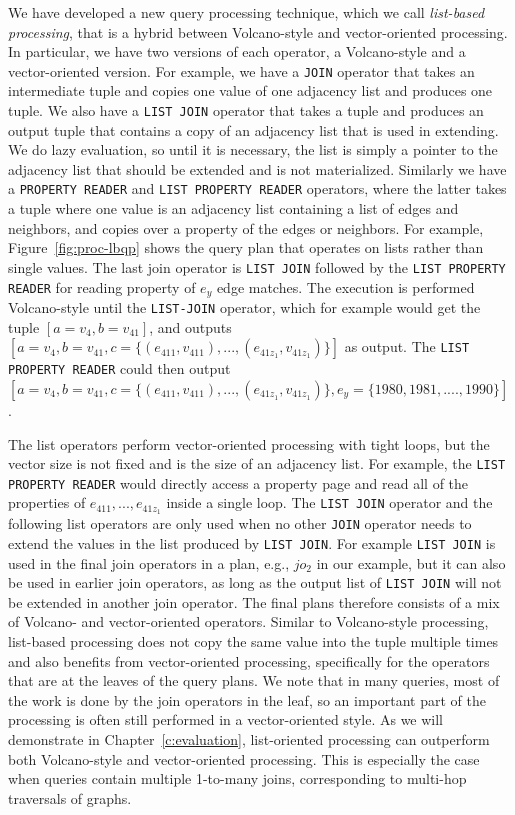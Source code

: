 We have developed a new query processing technique, which we call {\em list-based processing}, that is a hybrid between Volcano-style and vector-oriented processing. In particular, we have two versions of each operator, a Volcano-style and a vector-oriented version. For example, we have a \texttt{JOIN} operator that takes an intermediate tuple and copies one value of one adjacency list and produces one tuple. We also have a \texttt{LIST JOIN} operator that takes a tuple and produces an output tuple that contains a copy of an adjacency list that is used in extending. We do lazy evaluation, so until it is necessary, the list is simply a pointer to the adjacency list that should be extended and is not materialized. Similarly we have a \texttt{PROPERTY READER} and \texttt{LIST PROPERTY READER} operators, where the latter takes a tuple where one value is an adjacency list containing a list of edges and neighbors, and copies over a property of the edges or neighbors. For example, Figure~\ref{fig:proc-lbqp} shows the query plan that operates on lists rather than single values. The last join operator is \texttt{LIST JOIN} followed by the \texttt{LIST PROPERTY READER} for reading property of $e_y$ edge matches. The execution is performed Volcano-style until the \texttt{LIST-JOIN} operator, which for example would get the tuple $[a=v_4, b=v_{41}]$, and outputs $[a=v_4, b=v_{41}, c=\{(e_{411}, v_{411}), ..., (e_{41z_1}, v_{41z_1})\}]$ as output. The \texttt{LIST PROPERTY READER} could then output  $[a=v_4, b=v_{41}, c=\{(e_{411}, v_{411}), ..., (e_{41z_1}, v_{41z_1})\}, e_y=\{1980, 1981, ...., 1990\}]$. 

The list operators perform vector-oriented processing with tight loops, but the vector size is not fixed and is the size of an adjacency list. For example, the \texttt{LIST PROPERTY READER} would directly access a property page and read all of the properties of $e_{411}, ..., e_{41z_1}$ inside a single loop. The \texttt{LIST JOIN} operator and the following list operators are only used when no other \texttt{JOIN} operator needs to extend the values in the list produced by \texttt{LIST JOIN}. For example \texttt{LIST JOIN} is used in the final join operators in a plan, e.g., $jo_2$ in our example, but it can also be used in earlier join operators, as long as the output list of \texttt{LIST JOIN} will not be extended in another join operator. The final plans therefore consists of a mix of Volcano- and vector-oriented operators. Similar to Volcano-style processing, list-based processing does not copy the same value into the tuple multiple times and also benefits from vector-oriented processing, specifically for the operators that are at the leaves of the query plans. We note that in many queries, most of the work is done by the join operators in the leaf, so an important part of the processing is often still performed in a vector-oriented style. As we will demonstrate in Chapter~\ref{c:evaluation}, list-oriented processing can outperform both Volcano-style and vector-oriented processing. This is especially the case when queries contain multiple 1-to-many joins, corresponding to multi-hop traversals of graphs.

